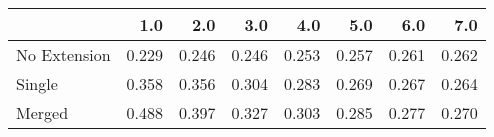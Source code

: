 \begin{tabular}{lrrrrrrr}
\toprule
{} &   1.0 &   2.0 &   3.0 &   4.0 &   5.0 &   6.0 &   7.0 \\
\midrule
No Extension & 0.229 & 0.246 & 0.246 & 0.253 & 0.257 & 0.261 & 0.262 \\
Single       & 0.358 & 0.356 & 0.304 & 0.283 & 0.269 & 0.267 & 0.264 \\
Merged       & 0.488 & 0.397 & 0.327 & 0.303 & 0.285 & 0.277 & 0.270 \\
\bottomrule
\end{tabular}
